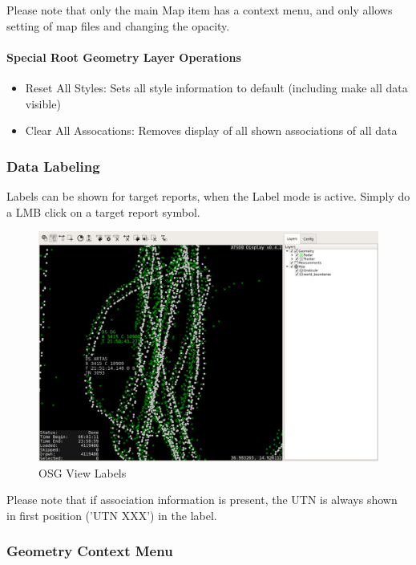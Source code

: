{Please note that only the main Map item has a context menu, and only allows setting of map files and changing the opacity.

\paragraph{Special Root Geometry Layer Operations}

\begin{itemize}
 \item Reset All Styles: Sets all style information to default (including make all data visible)
 \item Clear All Assocations: Removes display of all shown associations of all data
\end{itemize}


\subsubsection{Data Labeling}

Labels can be shown for target reports, when the Label mode is active. Simply do a LMB click on a target report symbol.

\begin{figure}[H]
    \hspace*{-2cm}
    \includegraphics[width=18cm,frame]{../screenshots/osgview_labels.png}
  \caption{OSG View Labels}
\end{figure}

Please note that if association information is present, the UTN is always shown in first position ('UTN XXX') in the label.

\subsubsection{Geometry Context Menu}

}
